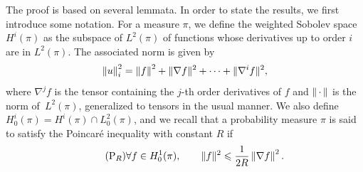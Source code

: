 \documentclass[11pt,a4paper]{article}
\newcommand{\dummy}{\,\cdot\,}
\newcommand{\grad}{\nabla}
\theoremstyle{plain}
\numberwithin{equation}{section}
\renewcommand{\leq}{\leqslant}
\begin{document}
The proof is based on several lemmata.
In order to state the results, we first introduce some notation.
For a measure $\pi$, we define the weighted Sobolev space $H^i(\pi)$ as the subspace of $L^2(\pi)$
of functions whose derivatives up to order $i$ are in $L^2(\pi)$.
The associated norm is given by
\[
    \norm{u}_i^2 = \norm{f}^2 + \norm*{\nabla f}^2 + \dotsb + \norm*{\nabla^i f}^2,
\]
where  $\nabla^j f$ is the tensor containing the $j$-th order derivatives of $f$ and $\norm{\dummy}$ is the norm of~$L^2(\pi)$,
generalized to tensors in the usual manner.
We also define $H^{i}_0(\pi) = H^i(\pi) \cap L^2_0(\pi)$,
and we recall that a probability measure $\pi$ is said to satisfy the Poincaré inequality with constant $R$ if
\begin{equation}
    \label{eq:poincare}
    \tag{P$_R$}
    \forall f \in H^1_0(\pi), \qquad
    \norm*{f}^2 \leq \frac{1}{2R} \norm{\grad f}^2.
\end{equation}
\end{document}
